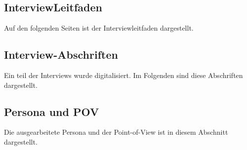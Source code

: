 \documentclass[12pt,a4paper]{article}
\begin{document}
\newpage
\vspace*{40mm}
\subsection{InterviewLeitfaden}
Auf den folgenden Seiten ist der Interviewleitfaden dargestellt.




\newpage
\vspace*{40mm}
\subsection{Interview-Abschriften}

Ein teil der Interviews wurde digitalisiert. Im Folgenden sind diese Abschriften dargestellt.



\newpage
\vspace*{40mm}
\subsection{Persona und POV}

Die ausgearbeitete Persona und der Point-of-View ist in diesem Abschnitt dargestellt.



\newpage
\vspace*{40mm}
\end{document}
